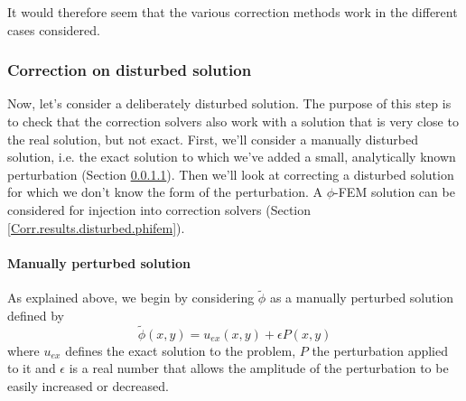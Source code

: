 It would therefore seem that the various correction methods work in the different cases considered.

\subsubsection{Correction on disturbed solution} \label{Corr.results.disturbed}

Now, let's consider a deliberately disturbed solution. The purpose of this step is to check that the correction solvers also work with a solution that is very close to the real solution, but not exact. First, we'll consider a manually disturbed solution, i.e. the exact solution to which we've added a small, analytically known perturbation (Section \ref{Corr.results.disturbed.ana}). Then we'll look at correcting a disturbed solution for which we don't know the form of the perturbation. A $\phi$-FEM solution can be considered for injection into correction solvers (Section \ref{Corr.results.disturbed.phifem}).

\paragraph{Manually perturbed solution} \label{Corr.results.disturbed.ana}
\graphicspath{{images/corr/corr_pert}}

As explained above, we begin by considering $\tilde{\phi}$ as a manually perturbed solution defined by
\begin{equation*}
	\tilde{\phi}(x,y)=u_{ex}(x,y)+\epsilon P(x,y)
\end{equation*}
where $u_{ex}$ defines the exact solution to the problem, $P$ the perturbation applied to it and $\epsilon$ is a real number that allows the amplitude of the perturbation to be easily increased or decreased. 

